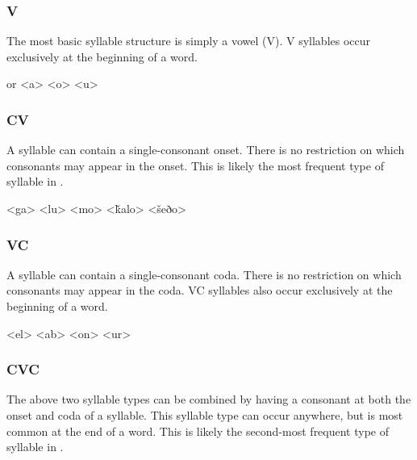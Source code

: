 \subsubsection{V}

The most basic syllable structure is simply a vowel (V). V syllables occur exclusively at the beginning of a word.

	    or 
	\a<e2>   
	   
	   
	   
\xe

\subsubsection{CV}

A syllable can contain a single-consonant onset. There is no restriction on which consonants may appear in the onset. This is likely the most frequent type of syllable in \langtvk.

	\a<ga>   
	\a<lu>   
	\a<mo>   
	\a<ǩalo>   
	\a<šeðo>    
\xe

\subsubsection{VC}

A syllable can contain a single-consonant coda. There is no restriction on which consonants may appear in the coda. VC syllables also occur exclusively at the beginning of a word.

	\a<el>   
	\a<ab>   
	\a<on>   
	\a<ur>   
\xe

\subsubsection{CVC}

The above two syllable types can be combined by having a consonant at both the onset and coda of a syllable. This syllable type can occur anywhere, but is most common at the end of a word. This is likely the second-most frequent type of syllable in \langtvk.

